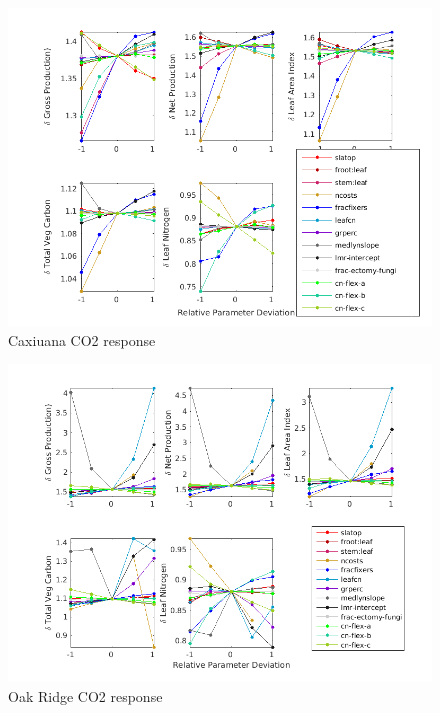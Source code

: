 \documentclass[draft,linenumbers]{agujournal}
\begin{document}
  
 \begin{figure}[h]
     \centering
     \includegraphics[width=1.3\textwidth, left]{matlab/figures/frac_deviation_CO2_response_1CLM5_1x1pt_Br-cax_ens_transient_ELEV_PI_y1.png}
     \caption{Caxiuana CO2 response}
     \label{Caxiuana CO2 response Parameter Sensitivity }
  \end{figure}
  
  
 \begin{figure}[h]
     \centering
     \includegraphics[width=1.3\textwidth, left]{matlab/figures/frac_deviation_CO2_response_1CLM5_1x1pt_US-ORN_ens_transient_ELEV_PI_y1.png}
     \caption{Oak Ridge CO2 response}
     \label{Oak Ridge CO2 response Parameter Sensitivity}
  \end{figure}
  
\end{document}
